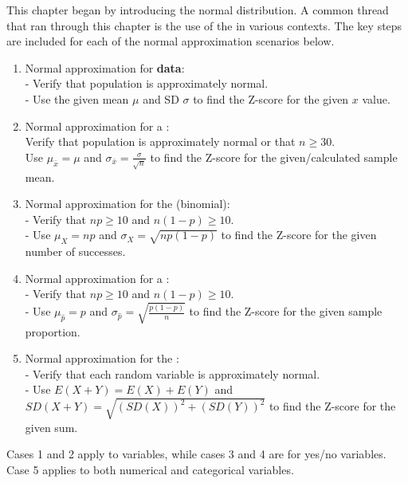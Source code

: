 {}



\reviewchapterheader{}

\noindent This chapter began by introducing the normal distribution.  A common thread that ran through this chapter is the use of the  in various contexts.  
The key steps are included for each of the normal approximation scenarios below.

\begin{enumerate}
\item Normal approximation for \textbf{data}:  
\\- Verify that population is approximately normal.
\\- Use the given mean $\mu$ and SD $\sigma$ to find the Z-score for the given $x$ value.
\item Normal approximation for a :  
\\Verify that population is approximately normal or that $n\ge 30$.
\\Use $\mu_{\bar{x}}=\mu$ and $\sigma_{\bar{x}}=\frac{\sigma}{\sqrt{n}}$ to find the Z-score for the given/calculated sample mean.
\item Normal approximation for the  (binomial):  
\\- Verify that $np\ge 10$ and $n(1-p)\ge 10$.
\\- Use $\mu_{\scriptscriptstyle{X}} = np$ and $\sigma_{\scriptscriptstyle{X}} = \sqrt{np(1-p)}$ to find the Z-score for the given number of successes.  
\item Normal approximation for a :  
\\- Verify that $np\ge 10$ and $n(1-p)\ge 10$.
\\- Use $\mu_{\hat{p}} = p$ and $\sigma_{\hat{p}} = \sqrt{\frac{p(1-p)}{n}}$ to find the Z-score for the given sample proportion.
\item Normal approximation for the :
\\- Verify that each random variable is approximately normal.
\\- Use $E(X+Y)=E(X)+E(Y)$ and $SD(X+Y)=\sqrt{(SD(X))^2+(SD(Y))^2}$ to find the Z-score for the given sum.
\end{enumerate}
Cases 1 and 2 apply to  variables, while cases 3 and 4 are for  yes/no variables.  Case 5 applies to both numerical and categorical variables.
